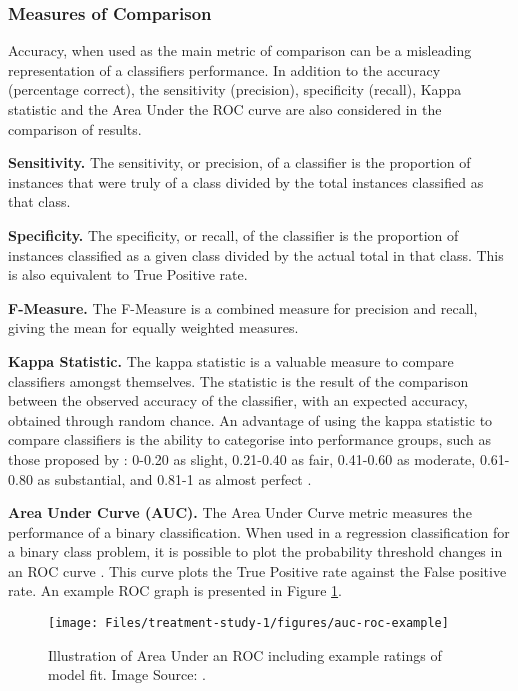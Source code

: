 \subsubsection{Measures of Comparison}
Accuracy, when used as the main metric of comparison can be a misleading representation of a classifiers performance. In addition to the accuracy (percentage correct), the sensitivity (precision), specificity (recall), Kappa statistic and the Area Under the ROC curve are also considered in the comparison of results.

\textbf{Sensitivity.}
The sensitivity, or precision, of a classifier is the proportion of instances that were truly of a class divided by the total instances classified as that class.

\textbf{Specificity.}
The specificity, or recall, of the classifier is the proportion of instances classified as a given class divided by the actual total in that class. This is also equivalent to True Positive rate.

\textbf{F-Measure.} The F-Measure is a combined measure for precision and recall, giving the mean for equally weighted measures.

\textbf{Kappa Statistic.}
The kappa statistic is a valuable measure to compare classifiers amongst themselves. The statistic is the result of the comparison between the observed accuracy of the classifier, with an expected accuracy, obtained through random chance. An advantage of using the kappa statistic to compare classifiers is the ability to categorise into performance groups, such as those proposed by \citeauthor{Landis1977}: 0-0.20 as slight, 0.21-0.40 as fair, 0.41-0.60 as moderate, 0.61-0.80 as substantial, and 0.81-1 as almost perfect \cite{Landis1977}.

\textbf{Area Under Curve (AUC).}
The Area Under Curve metric measures the performance of a binary classification. When used in a regression classification for a binary class problem, it is possible to plot the probability threshold changes in an ROC curve \cite{Metz1978}. This curve plots the True Positive rate against the False positive rate. An example ROC graph is presented in Figure \ref{fig: auc-roc-example}.

\begin{figure}[h]
    \centering
        \texttt{[image: Files/treatment-study-1/figures/auc-roc-example]}
        \caption{Illustration of Area Under an ROC including example ratings of model fit. Image Source:  \cite{Tape}.}
        \label{fig: auc-roc-example}
\end{figure}


